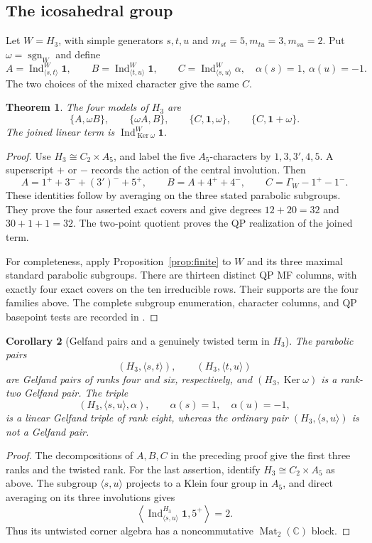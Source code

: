 \documentclass[11pt]{article}
\numberwithin{equation}{section}
\newtheorem{theorem}{Theorem}[section]
\newtheorem{corollary}[theorem]{Corollary}
\theoremstyle{definition}
\DeclareMathOperator{\Ind}{Ind}
\DeclareMathOperator{\sgn}{sgn}
\DeclareMathOperator{\Ker}{Ker}
\newcommand{\C}{\mathbb C}
\newcommand{\om}{\omega}
\newcommand{\one}{\mathbf 1}
\begin{document}
\subsection{The icosahedral group}

Let \(W=H_3\), with simple generators \(s,t,u\) and
\(m_{st}=5,m_{tu}=3,m_{su}=2\).
Put \(\om=\sgn_W\) and define
\[
 A=\Ind_{\langle s,t\rangle}^W\one,\qquad
 B=\Ind_{\langle t,u\rangle}^W\one,\qquad
 C=\Ind_{\langle s,u\rangle}^W\alpha,\quad\alpha(s)=1,\ \alpha(u)=-1 .
\]
The two choices of the mixed character give the same \(C\).

\begin{theorem}\label{thm:H3}
The four models of \(H_3\) are
\[
 \{A,\om B\},\qquad \{\om A,B\},\qquad
 \{C,\one,\om\},\qquad \{C,\one+\om\}.
\]
The joined linear term is \(\Ind_{\Ker\om}^W\one\).
\end{theorem}
\begin{proof}
Use \(H_3\cong C_2\times A_5\), and label the five \(A_5\)-characters by
\(1,3,3',4,5\).
A superscript \(+\) or \(-\) records the action of the central involution.
Then
\[
 A=1^++3^-+(3')^-+5^+,\qquad
 B=A+4^++4^-,\qquad C=\Gamma_W-1^+-1^- .
\]
These identities follow by averaging on the three stated parabolic subgroups.
They prove the four asserted exact covers and give degrees
\(12+20=32\) and \(30+1+1=32\).
The two-point quotient proves the QP realization of the joined term.

For completeness, apply Proposition~\ref{prop:finite} to \(W\) and its three maximal standard parabolic subgroups.
There are thirteen distinct QP MF columns, with exactly four exact covers on the ten irreducible rows.
Their supports are the four families above.
The complete subgroup enumeration, character columns, and QP basepoint tests are recorded in \cite{ZhangData}.
\end{proof}

\begin{corollary}[Gelfand pairs and a genuinely twisted term in \(H_3\)]
\label{cor:H3Gelfand}
The parabolic pairs
\[
 (H_3,\langle s,t\rangle),\qquad
 (H_3,\langle t,u\rangle)
\]
are Gelfand pairs of ranks four and six, respectively, and
\((H_3,\Ker\om)\) is a rank-two Gelfand pair.
The triple
\[
 (H_3,\langle s,u\rangle,\alpha),
 \qquad \alpha(s)=1,\quad\alpha(u)=-1,
\]
is a linear Gelfand triple of rank eight, whereas the ordinary pair
\((H_3,\langle s,u\rangle)\) is not a Gelfand pair.
\end{corollary}
\begin{proof}
The decompositions of \(A,B,C\) in the preceding proof give the first
three ranks and the twisted rank.
For the last assertion, identify \(H_3\cong C_2\times A_5\) as above.
The subgroup \(\langle s,u\rangle\) projects to a Klein four group in
\(A_5\), and direct averaging on its three involutions gives
\[
 \left\langle\Ind_{\langle s,u\rangle}^{H_3}\one,5^+\right\rangle=2.
\]
Thus its untwisted corner algebra has a noncommutative
\(\operatorname{Mat}_2(\C)\) block.
\end{proof}
\end{document}
